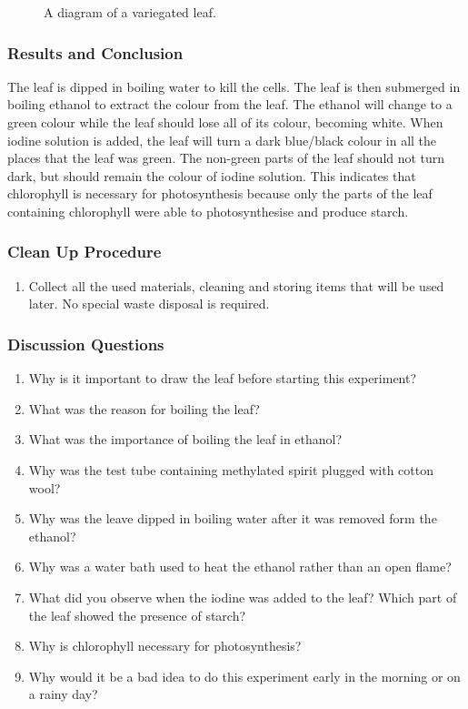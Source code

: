 \begin{figure}[h]
\begin{center}
\def\svgwidth{6cm}

\caption{A diagram of a variegated leaf.}
\label{fig:variegate leaf}
\end{center}
\end{figure}

\subsubsection*{Results and Conclusion}
The leaf is dipped in boiling water to kill the cells. The leaf is then submerged in boiling ethanol to extract the colour from the leaf. The ethanol will change to a green colour while the leaf should lose all of its colour, becoming white. When iodine solution is added, the leaf will turn a dark blue/black colour in all the places that the leaf was green. The non-green parts of the leaf should not turn dark, but should remain the colour of iodine solution. This indicates that chlorophyll is necessary for photosynthesis because only the parts of the leaf containing chlorophyll were able to photosynthesise and produce starch.

\subsubsection*{Clean Up Procedure}
\begin{enumerate}
\item{Collect all the used materials, cleaning and storing items that will be used later. No special waste disposal is required.}
\end{enumerate}

\subsubsection*{Discussion Questions}
\begin{enumerate}
\item{Why is it important to draw the leaf before starting this experiment?}
\item{What was the reason for boiling the leaf?}
\item{What was the importance of boiling the leaf in ethanol?}
\item{Why was the test tube containing methylated spirit plugged with cotton wool?}
\item{Why was the leave dipped in boiling water after it was removed form the ethanol?}
\item{Why was a water bath used to heat the ethanol rather than an open flame?}
\item{What did you observe when the iodine was added to the leaf? Which part of the leaf showed the presence of starch?}
\item{Why is chlorophyll necessary for photosynthesis?}
\item{Why would it be a bad idea to do this experiment early in the morning or on a rainy day?}
\end{enumerate}

